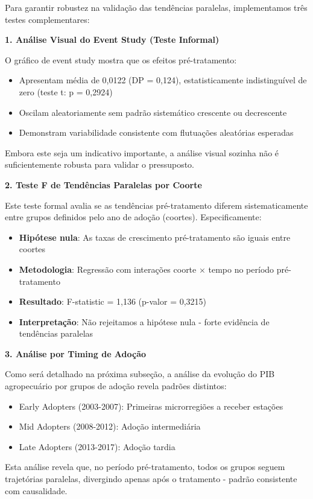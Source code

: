 \documentclass[
	12pt,				%
	oneside,			%
	a4paper,			%
	english,			%
	french,				%
	spanish,			%
	brazil				%
	]{abntex2}
\begin{document}
Para garantir robustez na validação das tendências paralelas, implementamos três testes complementares:

\textbf{1. Análise Visual do Event Study (Teste Informal)}

O gráfico de event study mostra que os efeitos pré-tratamento:
\begin{itemize}
\item Apresentam média de 0,0122 (DP = 0,124), estatisticamente indistinguível de zero (teste t: p = 0,2924)
\item Oscilam aleatoriamente sem padrão sistemático crescente ou decrescente
\item Demonstram variabilidade consistente com flutuações aleatórias esperadas
\end{itemize}

Embora este seja um indicativo importante, a análise visual sozinha não é suficientemente robusta para validar o pressuposto.

\textbf{2. Teste F de Tendências Paralelas por Coorte}

Este teste formal avalia se as tendências pré-tratamento diferem sistematicamente entre grupos definidos pelo ano de adoção (coortes). Especificamente:
\begin{itemize}
\item \textbf{Hipótese nula}: As taxas de crescimento pré-tratamento são iguais entre coortes
\item \textbf{Metodologia}: Regressão com interações coorte × tempo no período pré-tratamento
\item \textbf{Resultado}: F-statistic = 1,136 (p-valor = 0,3215)
\item \textbf{Interpretação}: Não rejeitamos a hipótese nula - forte evidência de tendências paralelas
\end{itemize}

\textbf{3. Análise por Timing de Adoção}

Como será detalhado na próxima subseção, a análise da evolução do PIB agropecuário por grupos de adoção revela padrões distintos:
\begin{itemize}
\item Early Adopters (2003-2007): Primeiras microrregiões a receber estações
\item Mid Adopters (2008-2012): Adoção intermediária
\item Late Adopters (2013-2017): Adoção tardia
\end{itemize}

Esta análise revela que, no período pré-tratamento, todos os grupos seguem trajetórias paralelas, divergindo apenas após o tratamento - padrão consistente com causalidade.
\end{document}
